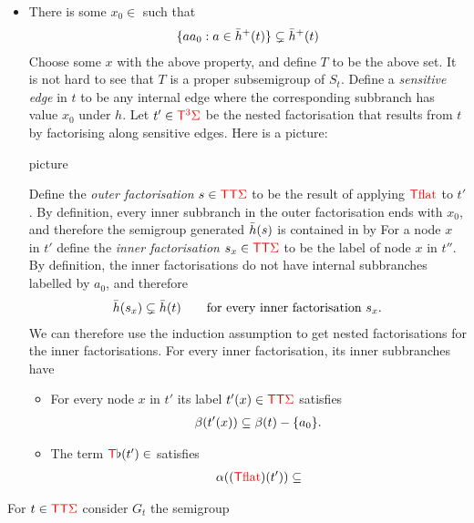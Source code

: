 \begin{itemize}
    \item There is some $x_0 \in $ such that 
    \begin{align}\label{eq:smaller-semigroup}
         \{ a a_0 :  a \in \bar h^+(t)\} \subsetneq  \bar h^+(t)
    \end{align}
    Choose some $x$ with the above property, and define $T$ to be the above set. It is not hard to see that $T$ is a proper subsemigroup of $S_t$.  Define a \emph{sensitive edge} in $t$ to be any internal edge where the corresponding subbranch has value $x_0$ under  $h$. Let $t' \in {\color{red}{\mathsf T}}^{{\color{red}{3}}} {\color{red}{\Sigma}}$ be the nested factorisation that results from $t$ by factorising along sensitive edges. Here is a picture:
    \begin{center}
        picture
    \end{center}
    Define the \emph{outer factorisation} $s \in {\color{red}{\mathsf T}} {\color{red}{\mathsf T}} {\color{red}{\Sigma}}$ to be the result of applying ${\color{red}{\mathsf T}} {\color{red}{\mathrm{flat}}}$ to $t'$. By definition, every inner subbranch in the outer factorisation ends with $x_0$, and therefore the semigroup generated $\bar h(s)$ is contained in 
     by  For a node  $x$ in $t'$ define the \emph{inner factorisation} $s_x \in {\color{red}{\mathsf T}} {\color{red}{\mathsf T}} {\color{red}{\Sigma}}$ to be the label of node $x$ in $t''$. 
    By definition, the inner factorisations do not have internal subbranches labelled by $a_0$, and therefore 
    \begin{align*}
    \bar h(s_x) \subsetneq \bar h(t) \qquad \text{for every inner factorisation $s_x$}.
    \end{align*}
    We can therefore use the induction assumption to get nested factorisations for the inner factorisations. 
    For every inner factorisation, its inner subbranches have 
    \begin{itemize}
        \item For every node $x$ in $t'$ its label $t'(x) \in {\color{red}{\mathsf T}} {\color{red}{\mathsf T}} {\color{red}{\Sigma}}$ satisfies 
        \begin{align*}
        \beta(t'(x)) \subseteq \beta(t) - \{a_0\}.
        \end{align*}
        \item The term ${\color{red}{\mathsf T}} \flat (t') \in $ satisfies
        \begin{align*}
            \alpha(({\color{red}{\mathsf T}} {\color{red}{\mathrm{flat}}})(t')) \subseteq 
        \end{align*}
    \end{itemize}
    
\end{itemize}

For $t \in {\color{red}{\mathsf T}} {\color{red}{\mathsf T}} {\color{red}{\Sigma}}$ consider $G_t$ the semigroup
